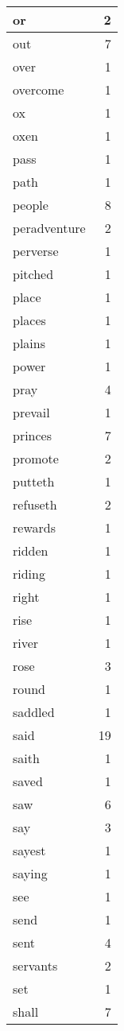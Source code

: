 \begin{center}
\begin{longtable}{l|r}
or & 2\\ \hline 
out & 7\\ \hline 
over & 1\\ \hline 
overcome & 1\\ \hline 
ox & 1\\ \hline 
oxen & 1\\ \hline 
pass & 1\\ \hline 
path & 1\\ \hline 
people & 8\\ \hline 
peradventure & 2\\ \hline 
perverse & 1\\ \hline 
pitched & 1\\ \hline 
place & 1\\ \hline 
places & 1\\ \hline 
plains & 1\\ \hline 
power & 1\\ \hline 
pray & 4\\ \hline 
prevail & 1\\ \hline 
princes & 7\\ \hline 
promote & 2\\ \hline 
putteth & 1\\ \hline 
refuseth & 2\\ \hline 
rewards & 1\\ \hline 
ridden & 1\\ \hline 
riding & 1\\ \hline 
right & 1\\ \hline 
rise & 1\\ \hline 
river & 1\\ \hline 
rose & 3\\ \hline 
round & 1\\ \hline 
saddled & 1\\ \hline 
said & 19\\ \hline 
saith & 1\\ \hline 
saved & 1\\ \hline 
saw & 6\\ \hline 
say & 3\\ \hline 
sayest & 1\\ \hline 
saying & 1\\ \hline 
see & 1\\ \hline 
send & 1\\ \hline 
sent & 4\\ \hline 
servants & 2\\ \hline 
set & 1\\ \hline 
shall & 7\\ \hline 

\end{longtable}
\end{center}

